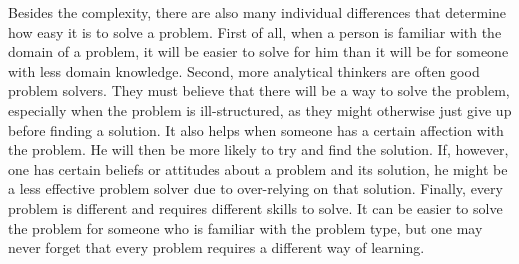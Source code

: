 Besides the complexity, there are also many individual differences that determine how easy it is to solve a problem. First of all, when a person is familiar with the domain of a problem, it will be easier to solve for him than it will be for someone with less domain knowledge. Second, more analytical thinkers are often good problem solvers. They must believe that there will be a way to solve the problem, especially when the problem is ill-structured, as they might otherwise just give up before finding a solution. It also helps when someone has a certain affection with the problem. He will then be more likely to try and find the solution. If, however, one has certain beliefs or attitudes about a problem and its solution, he might be a less effective problem solver due to over-relying on that solution. Finally, every problem is different and requires different skills to solve. It can be easier to solve the problem for someone who is familiar with the problem type, but one may never forget that every problem requires a different way of learning.


